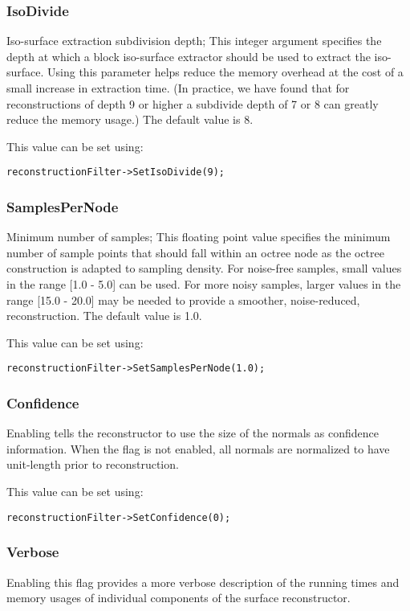 \documentclass{InsightArticle}
\begin{document}
\subsubsection{IsoDivide}
Iso-surface extraction subdivision depth; This integer argument specifies the depth at which a block iso-surface extractor should be used to extract the iso-surface. Using this parameter helps reduce the memory overhead at the cost of a small increase in extraction time. (In practice, we have found that for reconstructions of depth 9 or higher a subdivide depth of 7 or 8 can greatly reduce the memory usage.) The default value is 8.

This value can be set using:
\begin{verbatim}
reconstructionFilter->SetIsoDivide(9); 
\end{verbatim}

\subsubsection{SamplesPerNode}
Minimum number of samples; This floating point value specifies the minimum number of sample points that should fall within an octree node as the octree construction is adapted to sampling density. For noise-free samples, small values in the range [1.0 - 5.0] can be used. For more noisy samples, larger values in the range [15.0 - 20.0] may be needed to provide a smoother, noise-reduced, reconstruction. The default value is 1.0.

This value can be set using:
\begin{verbatim}
reconstructionFilter->SetSamplesPerNode(1.0); 
\end{verbatim}

\subsubsection{Confidence}
Enabling tells the reconstructor to use the size of the normals as confidence information. When the flag is not enabled, all normals are normalized to have unit-length prior to reconstruction.

This value can be set using:
\begin{verbatim}
reconstructionFilter->SetConfidence(0); 
\end{verbatim}

\subsubsection{Verbose}
Enabling this flag provides a more verbose description of the running times and memory usages of individual components of the surface reconstructor.
\end{document}
